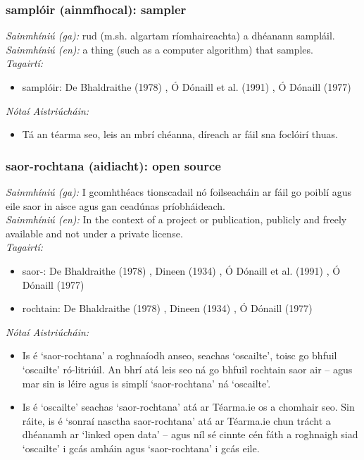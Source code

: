 \subsubsection*{samplóir (ainmfhocal): sampler}
 \noindent \textit{Sainmhíniú (ga):} rud (m.sh. algartam ríomhaireachta) a dhéanann sampláil.
\\
 \noindent \textit{Sainmhíniú (en):} a thing (such as a computer algorithm) that samples.
\\
 \noindent \textit{Tagairtí:}
\begin{itemize}
	\item samplóir: De Bhaldraithe (1978) \cite{de-bhaldraithe}, Ó Dónaill et al. (1991) \cite{focloir-beag}, Ó Dónaill (1977) \cite{odonaill}
\end{itemize}

 \noindent \textit{Nótaí Aistriúcháin:}
\begin{itemize}
	\item Tá an téarma seo, leis an mbrí chéanna, díreach ar fáil sna foclóirí thuas.
\end{itemize}


\subsubsection*{saor-rochtana (aidiacht): open source}
 \noindent \textit{Sainmhíniú (ga):} I gcomhthéacs tionscadail nó foilseacháin ar fáil go poiblí agus eile saor in aisce agus gan ceadúnas príobháideach.
\\
 \noindent \textit{Sainmhíniú (en):} In the context of a project or publication, publicly and freely available and not under a private license.
\\
 \noindent \textit{Tagairtí:}
\begin{itemize}
	\item saor-: De Bhaldraithe (1978) \cite{de-bhaldraithe}, Dineen (1934) \cite{dineen}, Ó Dónaill et al. (1991) \cite{focloir-beag}, Ó Dónaill (1977) \cite{odonaill}
	\item rochtain: De Bhaldraithe (1978) \cite{de-bhaldraithe}, Dineen (1934) \cite{dineen}, Ó Dónaill (1977) \cite{odonaill}
\end{itemize}

 \noindent \textit{Nótaí Aistriúcháin:}
\begin{itemize}
	\item Is é `saor-rochtana' a roghnaíodh anseo, seachas `oscailte', toisc go bhfuil `oscailte' ró-litriúil. An bhrí atá leis seo ná go bhfuil rochtain saor air -- agus mar sin is léire agus is simplí `saor-rochtana' ná `oscailte'.
	\item Is é `oscailte' seachas `saor-rochtana' atá ar Téarma.ie os a chomhair seo. Sin ráite, is é `sonraí nasctha saor-rochtana' atá ar Téarma.ie chun trácht a dhéanamh ar `linked open data' -- agus níl sé cinnte cén fáth a roghnaigh siad `oscailte' i gcás amháin agus `saor-rochtana' i gcás eile.
\end{itemize}


